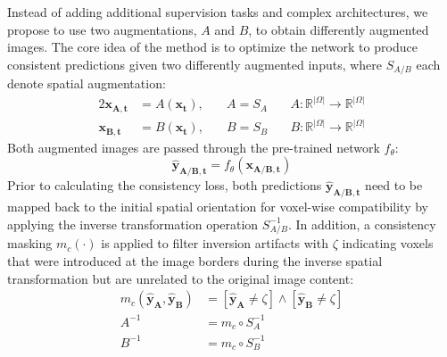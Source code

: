    Instead of adding additional supervision tasks and complex architectures, we propose to use two augmentations, $A$ and $B$, to obtain differently augmented images. The core idea of the method is to optimize the network to produce consistent predictions given two differently augmented inputs, where
    $S_{A/B}$ each denote spatial augmentation:
    \begin{alignat}{2}
        \mathbf{x_{A,t}} &= A(\mathbf{x_t}),\quad & A = S_A &\quad A: \mathbb{R}^{\lvert\Omega\rvert} \rightarrow \mathbb{R}^{\lvert\Omega\rvert} \\
        \mathbf{x_{B,t}} &= B(\mathbf{x_t}),\quad & B = S_B &\quad B: \mathbb{R}^{\lvert\Omega\rvert} \rightarrow \mathbb{R}^{\lvert\Omega\rvert}
    \end{alignat}
    Both augmented images are passed through the pre-trained network $f_\theta$:
    \begin{equation}
        \mathbf{\hat{y}_{A/B,t}} = f_\theta(\mathbf{x_{A/B,t}})
    \end{equation}
    Prior to calculating the consistency loss, both predictions $\mathbf{\hat{y}_{A/B,t}}$ need to be mapped back to the initial spatial orientation for voxel-wise compatibility by applying the inverse transformation operation $S_{A/B}^{-1}$. In addition, a consistency masking $m_{c}(\cdot)$ is applied to filter inversion artifacts with $\zeta$ indicating voxels that were introduced at the image borders during the inverse spatial transformation but are unrelated to the original image content:
    \begin{align}
        m_c(\mathbf{\hat{y}_A}, \mathbf{\hat{y}_B}) &= \left[\mathbf{\hat{y}_A} \neq \zeta\right] \wedge \left[\mathbf{\hat{y}_B}  \neq \zeta\right]\\
        A^{-1} &= m_c \circ S_{A}^{-1} \\
        B^{-1} &= m_c \circ S_{B}^{-1}
    \end{align}
